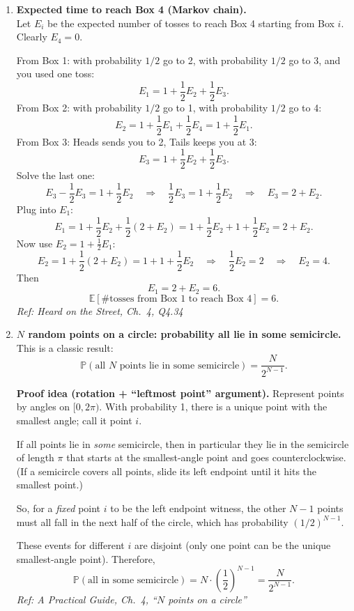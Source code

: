 \documentclass[11pt]{article}
\begin{document}
\begin{enumerate}[label=\textbf{\arabic*.}, resume]
\hfill{\small\textit{Ref: Heard on the Street, Ch.\ 4, Q4.32}}

\item \textbf{Expected time to reach Box 4 (Markov chain).}\\
Let $E_i$ be the expected number of tosses to reach Box 4 starting from Box $i$.
Clearly $E_4=0$.

From Box 1: with probability $1/2$ go to 2, with probability $1/2$ go to 3, and you used one toss:
\[
E_1 = 1 + \frac12 E_2 + \frac12 E_3.
\]
From Box 2: with probability $1/2$ go to 1, with probability $1/2$ go to 4:
\[
E_2 = 1 + \frac12 E_1 + \frac12 E_4 = 1 + \frac12 E_1.
\]
From Box 3: Heads sends you to 2, Tails keeps you at 3:
\[
E_3 = 1 + \frac12 E_2 + \frac12 E_3.
\]
Solve the last one:
\[
E_3 - \frac12 E_3 = 1 + \frac12 E_2 \quad\Longrightarrow\quad
\frac12 E_3 = 1 + \frac12 E_2 \quad\Longrightarrow\quad
E_3 = 2 + E_2.
\]
Plug into $E_1$:
\[
E_1 = 1 + \frac12 E_2 + \frac12(2+E_2)=1+\frac12E_2+1+\frac12E_2=2+E_2.
\]
Now use $E_2=1+\tfrac12E_1$:
\[
E_2 = 1 + \frac12(2+E_2)=1+1+\frac12E_2
\quad\Longrightarrow\quad
\frac12E_2=2 \quad\Longrightarrow\quad E_2=4.
\]
Then
\[
E_1 = 2 + E_2 = 6.
\]
\[
\boxed{\mathbb{E}[\text{\# tosses from Box 1 to reach Box 4}]=6.}
\]
\hfill{\small\textit{Ref: Heard on the Street, Ch.\ 4, Q4.34}}

\item \textbf{$N$ random points on a circle: probability all lie in some semicircle.}\\
This is a classic result:
\[
\boxed{\mathbb{P}(\text{all $N$ points lie in some semicircle})=\frac{N}{2^{N-1}}.}
\]

\medskip
\noindent\textbf{Proof idea (rotation + ``leftmost point'' argument).}
Represent points by angles on $[0,2\pi)$.
With probability 1, there is a unique point with the smallest angle; call it point $i$.

If all points lie in \emph{some} semicircle, then in particular they lie in the semicircle of length $\pi$ that starts at the smallest-angle point and goes counterclockwise. (If a semicircle covers all points, slide its left endpoint until it hits the smallest point.)

So, for a \emph{fixed} point $i$ to be the left endpoint witness, the other $N-1$ points must all fall in the next half of the circle, which has probability $(1/2)^{N-1}$.

These events for different $i$ are disjoint (only one point can be the unique smallest-angle point). Therefore,
\[
\mathbb{P}(\text{all in some semicircle})
= N\cdot \left(\frac12\right)^{N-1}
=\frac{N}{2^{N-1}}.
\]
\hfill{\small\textit{Ref: A Practical Guide, Ch.\ 4, ``$N$ points on a circle''}}


\end{enumerate}
\end{document}
